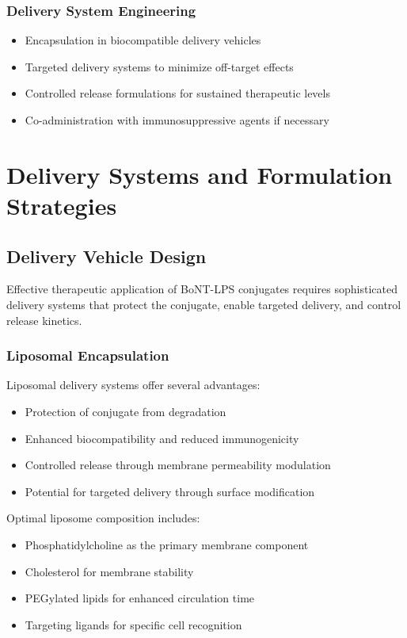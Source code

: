 \documentclass[11pt,a4paper]{article}
\begin{document}
\subsubsection{Delivery System Engineering}

\begin{itemize}
\item Encapsulation in biocompatible delivery vehicles
\item Targeted delivery systems to minimize off-target effects
\item Controlled release formulations for sustained therapeutic levels
\item Co-administration with immunosuppressive agents if necessary
\end{itemize}

\section{Delivery Systems and Formulation Strategies}

\subsection{Delivery Vehicle Design}

Effective therapeutic application of BoNT-LPS conjugates requires sophisticated delivery systems that protect the conjugate, enable targeted delivery, and control release kinetics.

\subsubsection{Liposomal Encapsulation}

Liposomal delivery systems offer several advantages:
\begin{itemize}
\item Protection of conjugate from degradation
\item Enhanced biocompatibility and reduced immunogenicity
\item Controlled release through membrane permeability modulation
\item Potential for targeted delivery through surface modification
\end{itemize}

Optimal liposome composition includes:
\begin{itemize}
\item Phosphatidylcholine as the primary membrane component
\item Cholesterol for membrane stability
\item PEGylated lipids for enhanced circulation time
\item Targeting ligands for specific cell recognition
\end{itemize}
\end{document}
